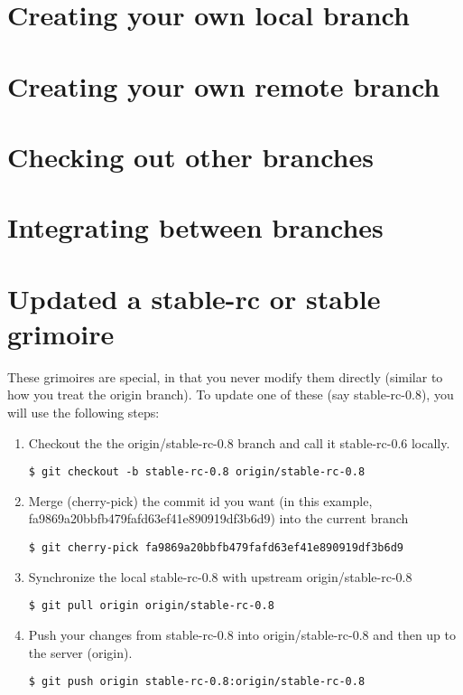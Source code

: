 \documentclass[a4paper,10pt]{book}
\begin{document}
\section{Creating your own local branch}
\section{Creating your own remote branch}
\section{Checking out other branches}
\section{Integrating between branches}
\section{Updated a stable-rc or stable grimoire}

These grimoires are special, in that you never modify them directly
(similar to how you treat the origin branch). To update one of these (say
stable-rc-0.8), you will use the following steps:
\begin{enumerate}
\item Checkout the the origin/stable-rc-0.8 branch and call it stable-rc-0.6
locally.
\begin{verbatim}
$ git checkout -b stable-rc-0.8 origin/stable-rc-0.8
\end{verbatim}
\item Merge (cherry-pick) the commit id you want (in this example,
fa9869a20bbfb479fafd63ef41e890919df3b6d9) into the current branch
\begin{verbatim}
$ git cherry-pick fa9869a20bbfb479fafd63ef41e890919df3b6d9
\end{verbatim}
\item Synchronize the local stable-rc-0.8 with upstream origin/stable-rc-0.8
\begin{verbatim}
$ git pull origin origin/stable-rc-0.8
\end{verbatim}
\item Push your changes from stable-rc-0.8 into origin/stable-rc-0.8 and then
up to the server (origin).
\begin{verbatim}
$ git push origin stable-rc-0.8:origin/stable-rc-0.8
\end{verbatim}
\end{enumerate}
\end{document}

